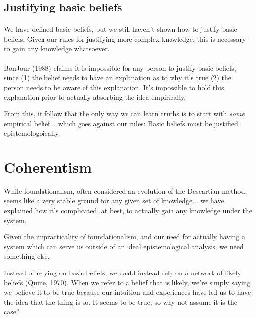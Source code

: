 \documentclass[11pt]{article}
\begin{document}
	\subsection*{Justifying basic beliefs}
	\paragraph{} We have defined basic beliefs, but we still haven't shown how to justify basic beliefs. Given our rules for justifying more complex knowledge, this is necessary to gain any knowledge whatsoever.
	
	\pagebreak
	\paragraph{} BonJour (1988) claims it is impossible for any person to justify basic beliefs, since (1) the belief needs to have an explanation as to why it's true (2) the person needs to be aware of this explanation. It's impossible to hold this explanation prior to actually absorbing the idea empirically. 

	From this, it follow that the only way we can learn truths is to start with \textit{some} empirical belief... which goes against our rules: Basic beliefs must be justified epistemologoically.

	\section*{Coherentism}
	\paragraph{} While foundationalism, often considered an evolution of the Descartian method, seems like a very stable ground for any given set of knowledge... we have explained how it's complicated, at best, to actually gain any knowledge under the system. 
	
	Given the impracticality of foundationalism, and our need for actually having a system which can serve us outside of an ideal epistemological analysis, we need something else.

	Instead of relying on basic beliefs, we could instead rely on a network of likely beliefs (Quine, 1970). When we refer to a belief that is likely, we're simply saying we believe it to be true because our intuition and experiences have led us to have the idea that the thing is so. It seems to be true, so why not assume it is the case?
\end{document}
